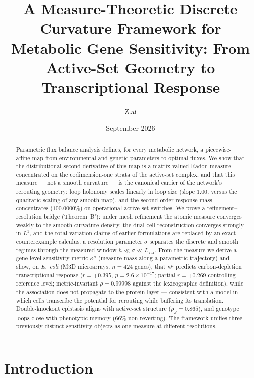 \documentclass[11pt,a4paper]{article}
\title{A Measure-Theoretic Discrete Curvature Framework for Metabolic
       Gene Sensitivity: From Active-Set Geometry to Transcriptional
       Response}
\author{Z.ai}
\date{September 2026}
\theoremstyle{plain}
\theoremstyle{definition}
\theoremstyle{remark}
\newcommand{\kmu}{\kappa^{\mu}}
\begin{document}
\maketitle

\begin{abstract}
\noindent
Parametric flux balance analysis defines, for every metabolic network, a
piecewise-affine map from environmental and genetic parameters to optimal
fluxes. We show that the distributional second derivative of this map is a
matrix-valued Radon measure concentrated on the codimension-one strata of the
active-set complex, and that this measure --- not a smooth curvature ---
is the canonical carrier of the network's rerouting geometry: loop holonomy
scales linearly in loop size (slope $1.00$, versus the quadratic scaling of
any smooth map), and the second-order response mass concentrates
($100.0000\%$) on operational active-set switches. We prove a
refinement--resolution bridge (Theorem~B$'$): under mesh refinement the
atomic measure converges weakly to the smooth curvature density, the
dual-cell reconstruction converges strongly in $L^1$, and the total-variation
claims of earlier formulations are replaced by an exact counterexample
calculus; a resolution parameter $\sigma$ separates the discrete and smooth
regimes through the measured window $h \ll \sigma \ll L_{\mathrm{var}}$.
From the measure we derive a gene-level sensitivity metric $\kmu$ (measure
mass along a parametric trajectory) and show, on
\emph{E.~coli} (M3D microarrays, $n=424$ genes), that $\kmu$ predicts
carbon-depletion transcriptional response ($r = +0.395$,
$p = 2.6 \times 10^{-17}$; partial $r = +0.269$ controlling reference
level; metric-invariant $\rho = 0.99998$ against the lexicographic
definition), while the association does not propagate to the protein layer
--- consistent with a model in which cells transcribe the potential for
rerouting while buffering its translation. Double-knockout epistasis aligns
with active-set structure ($\rho_S = 0.865$), and genotype loops close with
phenotypic memory ($66\%$ non-reverting). The framework unifies three
previously distinct sensitivity objects as one measure at different
resolutions.
\end{abstract}

\tableofcontents
\newpage

\section{Introduction}\label{sec:intro}
\end{document}
